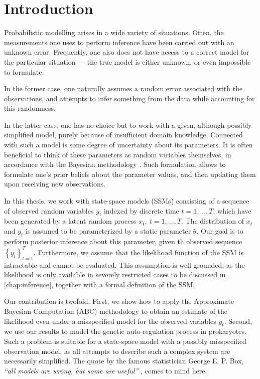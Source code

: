\chapter{Introduction}
\label{chap:introduction}

Probabilistic modelling arises in a wide variety of situations. Often, the measurements one uses to perform inference have been carried out with an unknown error. Frequently, one also does not have access to a correct model for the particular situation --- the true model is either unknown, or even impossible to formulate.

In the former case, one naturally assumes a random error associated with the observations, and attempts to infer something from the data while accounting for this randomness.

In the latter case, one has no choice but to work with a given, although possibly simplified model, purely because of insufficient domain knowledge. Connected with such a model is some degree of uncertainty about its parameters. It is often beneficial to think of these parameters as random variables themselves, in accordance with the Bayesian methodology \citep{bayes}. Such formulation allows to formulate one's prior beliefs about the parameter values, and then updating them upon receiving new observations.

In this thesis, we work with state-space models (SSMs) consisting of a sequence of observed random variables $y_t$ indexed by discrete time $t = 1, \ldots, T$, which have been generated by a latent random process $x_t,\ t = 1, \ldots, T$. The distribution of $x_t$ and $y_t$ is assumed to be parameterized by a static parameter $\theta$. Our goal is to perform posterior inference about this parameter, given th observed sequence $\left\{y_t\right\}_{t=1}^T$. Furthermore, we assume that the likelihood function of the SSM is intractable and cannot be evaluated. This assumption is well-grounded, as the likelihood is only available in severely restricted cases to be discussed in \autoref{chap:inference}, together with a formal definition of the SSM.

Our contribution is twofold. First, we show how to apply the Approximate Bayesian Computation (ABC) methodology \citep{abc-old-old, abc-old} to obtain an estimate of the likelihood even under a misspecified model for the observed variables $y_t$. Second, we use our results to model the genetic auto-regulation process in prokaryotes. Such a problem is suitable for a state-space model with a possibly misspecified observation model, as all attempts to describe such a complex system are necessarily simplified. The quote by the famous statistician George E. P. Box, \emph{``all models are wrong, but some are useful''} \citep{box-quote}, comes to mind here.

